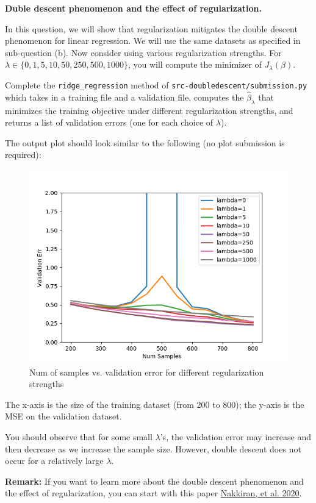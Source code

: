\item {}
\textbf{Duble descent phenomenon and the effect of regularization. }

In this question, we will show that regularization mitigates the double descent phenomenon for linear regression. We will use the same datasets as specified in sub-question (b). Now consider using various regularization strengths. For $\lambda\in \{0, 1, 5, 10, 50, 250, 500, 1000\}$, you will compute the minimizer of $J_\lambda(\beta).$ 

Complete the \texttt{ridge\_regression} method of \texttt{src-doubledescent/submission.py} which takes in a training file and a validation file, computes the $\hat{\beta}_\lambda$ that minimizes the training objective under different regularization strengths, and returns a list of validation errors (one for each choice of $\lambda$).



The output plot should look similar to the following (no plot submission is required):

\begin{figure}[H]
    \centering
    \vspace{-2mm}
    \includegraphics[width=0.65\linewidth]{04-doubledescent/reg.png}
    \caption{Num of samples vs. validation error for different regularization strengths}
    \centering
\end{figure}


The x-axis is the size of the training dataset (from 200 to 800); the y-axis is the MSE on the validation dataset.


You should observe that for some small $\lambda$'s, the validation error may increase and then decrease as we increase the sample size. However, double descent does not occur for a relatively large $\lambda$. 


\textbf{Remark:} If you want to learn more about the double descent phenomenon and the effect of regularization, you can start with this paper \href{https://arxiv.org/abs/2003.01897}{Nakkiran, et al. 2020}.